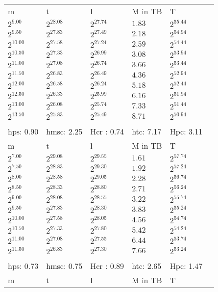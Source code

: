\begin{tabular}{llllll}
m & t & l & M in TB & T \\
$2^{9.00}$ & $2^{28.08}$ & $2^{27.74}$ & $1.83$ & $2^{55.44}$ \\
$2^{9.50}$ & $2^{27.83}$ & $2^{27.49}$ & $2.18$ & $2^{54.94}$ \\
$2^{10.00}$ & $2^{27.58}$ & $2^{27.24}$ & $2.59$ & $2^{54.44}$ \\
$2^{10.50}$ & $2^{27.33}$ & $2^{26.99}$ & $3.08$ & $2^{53.94}$ \\
$2^{11.00}$ & $2^{27.08}$ & $2^{26.74}$ & $3.66$ & $2^{53.44}$ \\
$2^{11.50}$ & $2^{26.83}$ & $2^{26.49}$ & $4.36$ & $2^{52.94}$ \\
$2^{12.00}$ & $2^{26.58}$ & $2^{26.24}$ & $5.18$ & $2^{52.44}$ \\
$2^{12.50}$ & $2^{26.33}$ & $2^{25.99}$ & $6.16$ & $2^{51.94}$ \\
$2^{13.00}$ & $2^{26.08}$ & $2^{25.74}$ & $7.33$ & $2^{51.44}$ \\
$2^{13.50}$ & $2^{25.83}$ & $2^{25.49}$ & $8.71$ & $2^{50.94}$ \\
 &  &  &  &  &  \\
hps: 0.90 & hmsc: 2.25 & Hcr : 0.74 & htc: 7.17 & Hpc: 3.11 &  \\
m & t & l & M in TB & T \\
$2^{7.00}$ & $2^{29.08}$ & $2^{29.55}$ & $1.61$ & $2^{57.74}$ \\
$2^{7.50}$ & $2^{28.83}$ & $2^{29.30}$ & $1.92$ & $2^{57.24}$ \\
$2^{8.00}$ & $2^{28.58}$ & $2^{29.05}$ & $2.28$ & $2^{56.74}$ \\
$2^{8.50}$ & $2^{28.33}$ & $2^{28.80}$ & $2.71$ & $2^{56.24}$ \\
$2^{9.00}$ & $2^{28.08}$ & $2^{28.55}$ & $3.22$ & $2^{55.74}$ \\
$2^{9.50}$ & $2^{27.83}$ & $2^{28.30}$ & $3.83$ & $2^{55.24}$ \\
$2^{10.00}$ & $2^{27.58}$ & $2^{28.05}$ & $4.56$ & $2^{54.74}$ \\
$2^{10.50}$ & $2^{27.33}$ & $2^{27.80}$ & $5.42$ & $2^{54.24}$ \\
$2^{11.00}$ & $2^{27.08}$ & $2^{27.55}$ & $6.44$ & $2^{53.74}$ \\
$2^{11.50}$ & $2^{26.83}$ & $2^{27.30}$ & $7.66$ & $2^{53.24}$ \\
 &  &  &  &  &  \\
hps: 0.73 & hmsc: 0.75 & Hcr : 0.89 & htc: 2.65 & Hpc: 1.47 &  \\
m & t & l & M in TB & T \\

\end{tabular}
